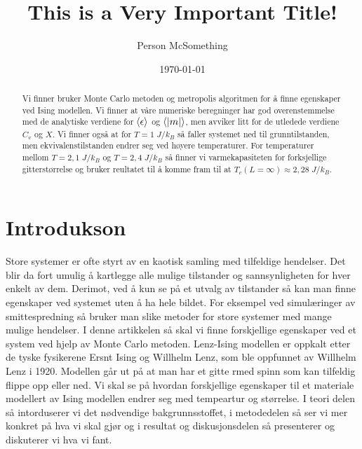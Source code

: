 \documentclass[reprint,english,notitlepage]{revtex4-2}  %
\begin{document}
\title{This is a Very Important Title!}   %
\author{Person McSomething}               %
\date{\today}                             %
\noaffiliation                            %
\begin{abstract}                          %
Vi finner bruker Monte Carlo metoden og metropolis algoritmen for å finne egenskaper ved Ising modellen. Vi finner at våre numeriske beregninger har god overenstemmelse med de analytiske verdiene for $\expval{\epsilon}$ og $\expval{|m|}$, men avviker litt for de utledede verdiene $C_v$ og $X$. Vi finner også at for $T = 1 \; J/k_B$ så faller systemet ned til grunntilstanden, men ekvivalenstilstanden endrer seg ved høyere temperaturer. For temperaturer mellom $T = 2,1 \; J/k_B$ og $T = 2,4 \; J/k_B$ så finner vi varmekapasiteten for forksjellige gitterstørrelse og bruker reultatet til å komme fram til at $T_c \left ( L = \infty \right ) \approx 2,28 \; J/k_B$.%
\end{abstract}                            %
\maketitle                                %

\section{Introdukson}

Store systemer er ofte styrt av en kaotisk samling med tilfeldige hendelser. Det blir da fort umulig å kartlegge alle mulige tilstander og sannsynligheten for hver enkelt av dem. Derimot, ved å kun se på et utvalg av tilstander så kan man finne egenskaper ved systemet uten å ha hele bildet. For eksempel ved simulæringer av smittespredning så bruker man slike metoder for store systemer med mange mulige hendelser. I denne artikkelen så skal vi finne forskjellige egenskaper ved et system ved hjelp av Monte Carlo metoden. Lenz-Ising modellen er oppkalt etter de tyske fysikerene Ersnt Ising og Willhelm Lenz, som ble oppfunnet av Willhelm Lenz i 1920. Modellen går ut på at man har et gitte rmed spinn som kan tilfeldig flippe opp eller ned. Vi skal se på hvordan forskjellige egenskaper til et materiale modellert av Ising modellen endrer seg med tempeartur og størrelse. I teori delen så intorduserer vi det nødvendige bakgrunnsstoffet, i metodedelen så ser vi mer konkret på hva vi skal gjør og i resultat og diskusjonsdelen så presenterer og diskuterer vi hva vi fant.
\end{document}
